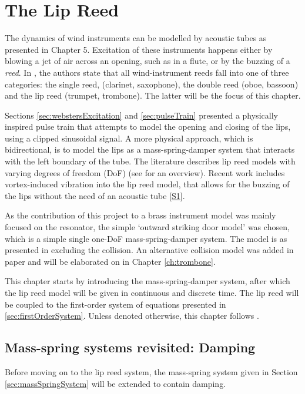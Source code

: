 \chapter{The Lip Reed}\label{ch:lipreed}
The dynamics of wind instruments can be modelled by acoustic tubes as presented in Chapter 5. Excitation of these instruments happens either by blowing a jet of air across an opening, such as in a flute, or by the buzzing of a \textit{reed}. In \cite{Fletcher1998}, the authors state that all wind-instrument reeds fall into one of three categories: the single reed, (clarinet, saxophone), the double reed (oboe, bassoon) and the lip reed (trumpet, trombone). The latter will be the focus of this chapter.

Sections \ref{sec:webstersExcitation} and \ref{sec:pulseTrain} presented a physically inspired pulse train that attempts to model the opening and closing of the lips, using a clipped sinusoidal signal. A more physical approach, which is bidirectional, is to model the lips as a mass-spring-damper system that interacts with the left boundary of the tube. The literature describes lip reed models with varying degrees of freedom (DoF) (see \cite{Fletcher1998,Harrison2018} for an overview). Recent work includes vortex-induced vibration into the lip reed model, that allows for the buzzing of the lips without the need of an acoustic tube [\hyperref[ch:listOfPublications]{S1}]. 

As the contribution of this project to a brass instrument model was mainly focused on the resonator, the simple `outward striking door model' was chosen, which is a simple single one-DoF mass-spring-damper system. The model is as presented in \cite{Bilbao2009Reed} excluding the collision. An alternative collision model was added in paper \citeP[H] and will be elaborated on in Chapter \ref{ch:trombone}.

This chapter starts by introducing the mass-spring-damper system, after which the lip reed model will be given in continuous and discrete time. The lip reed will be coupled to the first-order system of equations presented in \ref{sec:firstOrderSystem}. Unless denoted otherwise, this chapter follows \cite{Harrison2018}. 

\section{Mass-spring systems revisited: Damping}\label{sec:massSpringDamping}
Before moving on to the lip reed system, the mass-spring system given in Section \ref{sec:massSpringSystem} will be extended to contain damping. 

